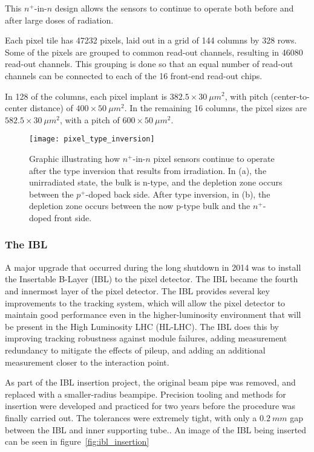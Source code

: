 This $n^+$-in-$n$ design allows the sensors to continue to operate both before and after large doses of radiation.

Each pixel tile has 47232 pixels, laid out in a grid of 144 columns by 328 rows.
Some of the pixels are grouped to common read-out channels, resulting in 46080 read-out channels.
This grouping is done so that an equal number of read-out channels can be connected to each of
the 16 front-end read-out chips.\cite{pixels-2008}

In 128 of the columns, each pixel implant is $382.5\times30~\mu m^2$, with pitch (center-to-center distance) of  $400\times50~\mu m^2$.
In the remaining 16 columns, the pixel sizes are $582.5\times30~\mu m^2$, with a pitch of  $600\times50~\mu m^2$.\cite{pixels-2008}

\begin{figure}[h]
\texttt{[image: pixel\_type\_inversion]}
\caption{Graphic illustrating how $n^+$-in-$n$ pixel sensors continue to operate after the type inversion that results from irradiation.
In (a), the unirradiated state, the bulk is n-type, and the depletion zone occurs between the $p^+$-doped back side.
After type inversion, in (b), the depletion zone occurs between the now p-type bulk and the $n^+$-doped front side.
\cite{pixels-2008}}
\label{fig:pixel_type_inversion}
\end{figure}

\subsubsection{The IBL}
A major upgrade that occurred during the long shutdown in 2014 was to install the Insertable B-Layer (IBL) to the pixel detector.
The IBL became the fourth and innermost layer of the pixel detector.
The IBL provides several key improvements to the tracking system, which will allow the pixel detector to maintain
good performance even in the higher-luminosity environment that will be present in the High Luminosity LHC (HL-LHC).\cite{ibl-tdr}
The IBL does this by improving tracking robustness against module failures,
adding measurement redundancy to mitigate the effects of pileup,
and adding an additional measurement closer to the interaction point.\cite{ibl-tdr}

As part of the IBL insertion project, the original beam pipe was removed, and replaced with a smaller-radius beampipe.
Precision tooling and methods for insertion were developed and practiced for two years before the procedure was finally carried out.
The tolerances were extremely tight, with only a $0.2~mm$ gap between the IBL and inner supporting tube.\cite{ibl-website}.
An image of the IBL being inserted can be seen in figure~\ref{fig:ibl_insertion}


